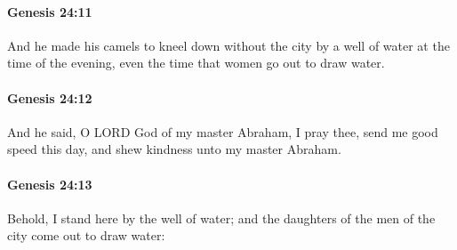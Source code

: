 		\paragraph{Genesis 24:11} %
			\label{GENESIS-24-11}

			And he made his camels to kneel down without the city by a well of water at the time of the evening, even the time that women go out to draw water.


		\paragraph{Genesis 24:12} %
			\label{GENESIS-24-12}

			And he said, O LORD God of my master Abraham, I pray thee, send me good speed this day, and shew kindness unto my master Abraham.


		\paragraph{Genesis 24:13} %
			\label{GENESIS-24-13}

			Behold, I stand here by the well of water; and the daughters of the men of the city come out to draw water:


